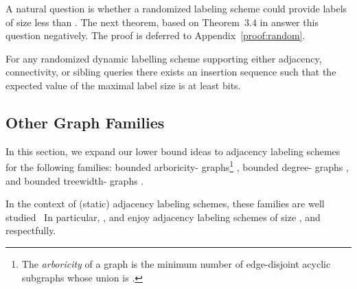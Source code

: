 \documentclass{llncs}
\begin{document}
A natural question is whether a randomized labeling scheme could provide labels of size less than .
The next theorem, based on Theorem~3.4 in \cite{cohen2010labeling} answer this question negatively. The proof is deferred to Appendix~\ref{proof:random}.
\begin{theorem}\label{thm:random}
	For any randomized dynamic labelling scheme supporting either
	adjacency, connectivity, or sibling queries
	there exists an insertion sequence such that the expected value
	of the maximal label size is at least  bits.
\end{theorem}

\subsection{Other Graph Families}\label{sec-other-graphs}
In this section, we expand our lower bound ideas to adjacency labeling schemes for the  following families: bounded arboricity- graphs\footnote{The \emph{arboricity} of a graph   is the minimum number of edge-disjoint acyclic subgraphs whose union is .} ,  bounded degree- graphs , and  bounded treewidth- graphs .

In the context of (static) adjacency  labeling schemes,  these families  are   well studied~\cite{Kannan92,Alstrup02,gavoille2007shorter,chung1990universal,Adjiasvhili14}
In particular,  ,  and    enjoy  adjacency labeling schemes of size  \cite{gavoille2007shorter}, and  \cite{Alstrup02} respectfully.
\end{document}
